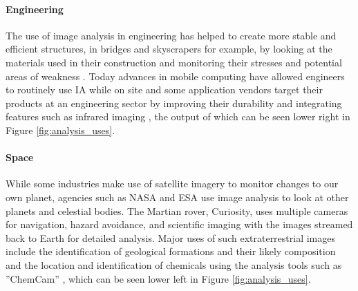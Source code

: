 		\paragraph{Engineering}
			The use of image analysis in engineering has helped to create more stable and efficient structures, in bridges and skyscrapers for example, by looking at the materials used in their construction \citep{concreteanalysis} and monitoring their stresses and potential areas of weakness \citep{bridgecables}. Today advances in mobile computing have allowed engineers to routinely use IA while on site and some application vendors target their products at an engineering sector by improving their durability and integrating features such as infrared imaging \citep{catphone}, the output of which can be seen lower right in Figure \ref{fig:analysis_uses}.
		\paragraph{Space}
			While some industries make use of satellite imagery to monitor changes to our own planet, agencies such as NASA and ESA use image analysis to look at other planets and celestial bodies. The Martian rover, Curiosity, uses multiple cameras for navigation, hazard avoidance, and scientific imaging with the images streamed back to Earth for detailed analysis. Major uses of such extraterrestrial images include the identification of geological formations and their likely composition \citep{curiositysand, curiositygravel} and the location and identification of chemicals using the analysis tools such as ”ChemCam” \citep{curiosityhydrogen}, which can be seen lower left in Figure \ref{fig:analysis_uses}.